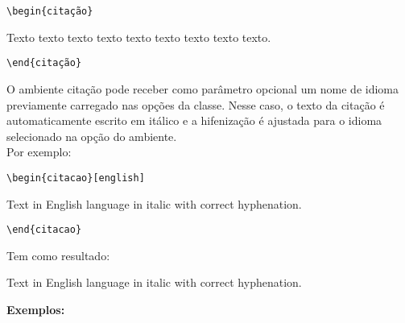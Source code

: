 \verb+\begin{citação}+

Texto texto texto texto texto texto texto texto texto.

\verb+\end{citação}+

O ambiente citação pode receber como parâmetro opcional um nome de idioma previamente carregado nas opções da classe. Nesse caso, o texto da citação é automaticamente escrito em itálico e a hifenização é ajustada para o idioma selecionado na opção do ambiente.\\
 Por exemplo:
 
\verb+\begin{citacao}[english]+
 
 Text in English language in italic with correct hyphenation.
 
\verb+\end{citacao}+
 
Tem como resultado:
\begin{citacao}[english]
Text in English language in italic with correct hyphenation. \\
\end{citacao}

\textbf{Exemplos:} \\


